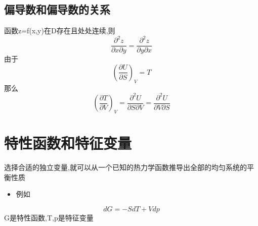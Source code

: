 \documentclass[11pt]{article}
\begin{document}
\subsection{偏导数和偏导数的关系}
\label{sec:org611bf9a}
函数z=f(x,y)在D存在且处处连续,则
\[
\frac{\partial^2 z}{\partial x \partial y}=\frac{\partial^2 z}{\partial y \partial x}
\]
由于
\[
(\frac{\partial U}{\partial S})_V =T
\]
那么
\[
(\frac{\partial T}{\partial V})_V=\frac{\partial^2 U}{\partial S \partial V}=\frac{\partial^2 U}{\partial V
 \partial S}
\]
\section{特性函数和特征变量}
\label{sec:org1b66bdc}
选择合适的独立变量,就可以从一个已知的热力学函数推导出全部的均匀系统的平衡性质
\begin{itemize}
\item 例如
\end{itemize}

\[
dG=-SdT+Vdp
\]
G是特性函数,T,p是特征变量
\end{document}
